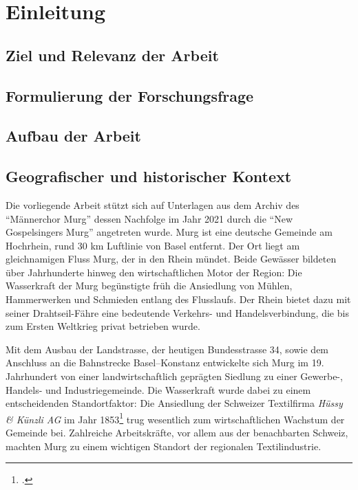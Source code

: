 \documentclass[12pt, a4paper, ngerman, bidi=default]{article}
\let\cite\footcite
\begin{document}
\newpage
\section{Einleitung}
\subsection{Ziel und Relevanz der Arbeit}
\subsection{Formulierung der Forschungsfrage}
\subsection{Aufbau der Arbeit}
\subsection{Geografischer und historischer Kontext}
Die vorliegende Arbeit stützt sich auf Unterlagen aus dem Archiv des \enquote{Männerchor Murg} dessen Nachfolge im Jahr 2021 
durch die \enquote{New Gospelsingers Murg} angetreten wurde. Murg ist eine deutsche Gemeinde am Hochrhein, 
rund 30 km Luftlinie von Basel entfernt. Der Ort liegt am gleichnamigen Fluss Murg, der in den Rhein mündet. 
Beide Gewässer bildeten über Jahrhunderte hinweg den wirtschaftlichen Motor der Region: Die Wasserkraft der Murg 
begünstigte früh die Ansiedlung von Mühlen, Hammerwerken und Schmieden entlang des Flusslaufs. Der Rhein bietet dazu mit seiner 
Drahtseil-Fähre eine bedeutende Verkehrs- und Handelsverbindung, die bis zum Ersten Weltkrieg privat betrieben wurde.

Mit dem Ausbau der Landstrasse, der heutigen Bundesstrasse 34, sowie dem Anschluss an die Bahnstrecke Basel–Konstanz 
entwickelte sich Murg im 19. Jahrhundert von einer landwirtschaftlich geprägten Siedlung zu einer Gewerbe-, Handels- und 
Industriegemeinde. Die Wasserkraft wurde dabei zu einem entscheidenden Standortfaktor: Die Ansiedlung der Schweizer 
Textilfirma \textit{Hüssy \& Künzli AG} im Jahr 1853\cite[vgl.][]{gemeinde_murg_geschichte_nodate} trug wesentlich 
zum wirtschaftlichen Wachstum der Gemeinde bei. Zahlreiche Arbeitskräfte, vor allem aus der benachbarten Schweiz, 
machten Murg zu einem wichtigen Standort der regionalen Textilindustrie.
\end{document}
